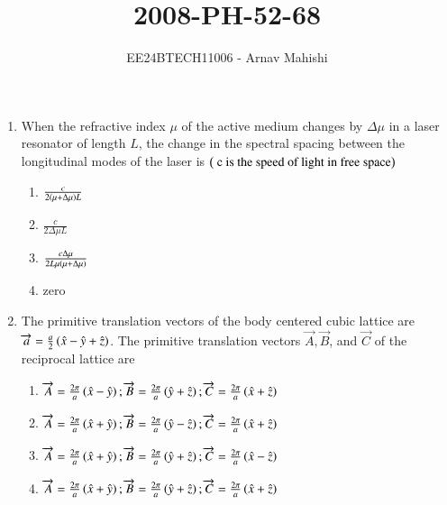 \documentclass[journal]{IEEEtran}
\begin{document}

\vspace{3cm}

\title{2008-PH-52-68}
\author{EE24BTECH11006 - Arnav Mahishi}
{\let\newpage\relax\maketitle}
\begin{enumerate}
\item{
When the refractive index $\mu$ of the active medium changes by $\Delta\mu$ in a laser resonator of length $L$, the change in the spectral spacing between the longitudinal modes of the laser is $\left(\text{ c is the speed of light in free space}\right)$ 
\begin{multicols}{2}
\begin{enumerate}
\item$\frac{c}{2\left(\mu+\Delta\mu\right)L}$
\item$\frac{c}{2\Delta\mu L}$
\item$\frac{c\Delta\mu}{2L\mu\left(\mu+\Delta\mu\right)}$
\item zero
\end{enumerate}
\end{multicols}
}
\item{
The primitive translation vectors of the body centered cubic lattice are $\overrightarrow{a}=\frac{a}{2}\left(\hat{x}-\hat{y}+\hat{z}\right)$. The primitive translation vectors $\overrightarrow{A},\overrightarrow{B}$, and $\overrightarrow{C}$ of the reciprocal lattice are
\begin{enumerate}
\item $\overrightarrow{A}=\frac{2\pi}{a}\left(\hat{x}-\hat{y}\right);\overrightarrow{B}=\frac{2\pi}{a}\left(\hat{y}+\hat{z}\right);\overrightarrow{C}=\frac{2\pi}{a}\left(\hat{x}+\hat{z}\right)$
\item $\overrightarrow{A}=\frac{2\pi}{a}\left(\hat{x}+\hat{y}\right);\overrightarrow{B}=\frac{2\pi}{a}\left(\hat{y}-\hat{z}\right);\overrightarrow{C}=\frac{2\pi}{a}\left(\hat{x}+\hat{z}\right)$
\item $\overrightarrow{A}=\frac{2\pi}{a}\left(\hat{x}+\hat{y}\right);\overrightarrow{B}=\frac{2\pi}{a}\left(\hat{y}+\hat{z}\right);\overrightarrow{C}=\frac{2\pi}{a}\left(\hat{x}-\hat{z}\right)$
\item $\overrightarrow{A}=\frac{2\pi}{a}\left(\hat{x}+\hat{y}\right);\overrightarrow{B}=\frac{2\pi}{a}\left(\hat{y}+\hat{z}\right);\overrightarrow{C}=\frac{2\pi}{a}\left(\hat{x}+\hat{z}\right)$

\end{enumerate}}
\end{enumerate}
\end{document}
